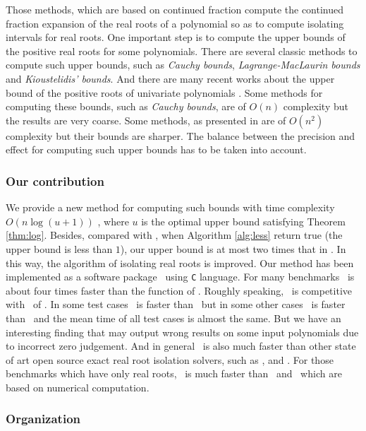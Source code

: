 Those methods, which are  based on  continued fraction compute the continued fraction expansion of the real roots of a polynomial so as to  compute isolating intervals for real roots. One important step
is to  compute the upper bounds of the positive real roots for some polynomials. There are  several classic methods to compute such upper bounds, such as {\em Cauchy bounds}, {\em Lagrange-MacLaurin  bounds} and {\em Kioustelidis' bounds}. And there are many recent works about the upper bound of the positive roots of univariate polynomials \cite{hong98,ste05,akr08}. Some methods for computing these bounds,  such as {\em Cauchy bounds}, are of $O(n)$ complexity but the results are very coarse. Some methods, as presented in  \cite{akr08} are of $O(n^2)$ complexity but their bounds are sharper. The balance between the precision and effect for computing such upper bounds has to be taken into account.
\subsubsection{Our contribution}
We provide a new method for computing such bounds with time complexity $O(n\log(u+1))$ , where $u$ is the optimal upper bound satisfying Theorem \ref{thm:log}. Besides, compared
with \cite{akr08}, when  Algorithm \ref{alg:less} return true (the upper bound is less than $1$), our upper bound is at most two times that in \cite{akr08}. In this way, the algorithm of   isolating real roots is improved.  Our  method has been implemented as a  software package \froot\ using \texttt{C} language. For many benchmarks \froot \  is about four  times
faster   than  the function {\tt \REALROOT} of \MAPLE. Roughly speaking, \froot\ is competitive with \inte\ of \MM. In some test cases \froot\ is faster than \inte\ but in some other cases \inte\ is faster than \froot\ and the mean time of all test cases is almost the same. But we have an interesting finding that {\tt \inte} may output wrong results on some input polynomials due to incorrect zero judgement. %
And in general \froot\ is also much faster than other state of art
open source exact real root isolation solvers, such as \cf, \AND and \SLV. For those  benchmarks which  have only real roots, \froot\ is much faster than \sle\ and \eign\ which are based on numerical computation.

\subsubsection{Organization}
